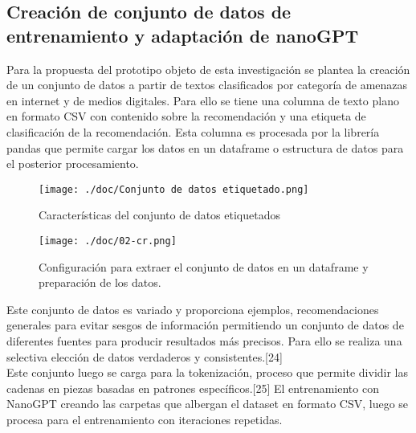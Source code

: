
\subsection{Creación de conjunto de datos de entrenamiento y adaptación de nanoGPT}\label{section:Creacion de conjunto de datos} 
Para la propuesta del prototipo objeto de esta investigación se plantea la creación de un conjunto de datos a partir de textos clasificados por categoría de amenazas en internet y de medios digitales. Para ello se tiene una columna de texto plano en formato CSV con contenido sobre la recomendación y una etiqueta de clasificación de la recomendación. Esta columna es procesada por la librería pandas que permite cargar los datos en un dataframe o estructura de datos para el posterior procesamiento.\cite{Reiss2021} \\

\begin{figure}[H]
   \centering %
       \texttt{[image: ./doc/Conjunto de datos etiquetado.png]} 
   \caption{Características del conjunto de datos etiquetados \cite{}}
  \label{figure:Conjunto de datos}  %
\end{figure}
\begin{figure}[H]
   \centering %
       \texttt{[image: ./doc/02-cr.png]} 
   \caption{Configuración para extraer el conjunto de datos en un dataframe y preparación de los datos.  \cite{}}
  \label{figure:Extraxión de datos del csv}  %
\end{figure}

Este conjunto de datos es variado y proporciona ejemplos, recomendaciones generales para evitar sesgos de información permitiendo un conjunto de datos de diferentes fuentes para producir resultados más precisos. Para ello se realiza una selectiva elección de datos verdaderos y consistentes.[24] \\
Este conjunto luego se carga para la tokenización, proceso que permite dividir las cadenas en piezas basadas en patrones específicos.[25] El entrenamiento con NanoGPT creando las carpetas que albergan el dataset en formato CSV, luego se procesa para el entrenamiento con iteraciones repetidas. \\

